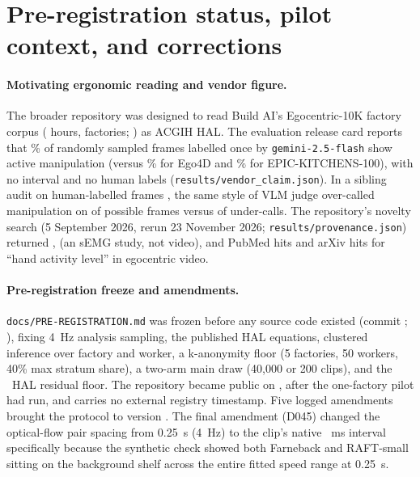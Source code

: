 \documentclass[11pt]{article}
\begin{document}

{\footnotesize\setlength{\bibsep}{0pt}}

\appendix

\section{Pre-registration status, pilot context, and corrections}
\label{app:protocol}

\paragraph{Motivating ergonomic reading and vendor figure.}
The broader repository was designed to read Build AI's Egocentric-10K factory corpus
(\cgCorpusHours{} hours, \cgCorpusFactories{} factories; \citep{buildai2025corpus}) as ACGIH HAL.
The evaluation release card \citep{buildai2025eval} reports that \cgVendorPct{}\% of
\cgVendorFrames{} randomly sampled frames labelled once by \texttt{gemini-2.5-flash} show active
manipulation (versus \cgVendorPctEgo{}\% for Ego4D and \cgVendorPctEpic{}\% for
EPIC-KITCHENS-100), with no interval and no human labels (\texttt{results/vendor\_claim.json}).
In a sibling audit on \cgSibLabels{} human-labelled frames \citep{theodoro2026vernier}, the same
style of VLM judge over-called manipulation on \cgSibOver{} of \cgSibOverOf{} possible frames
versus \cgSibUnder{} of \cgSibUnderOf{} under-calls. The repository's novelty search (5 September
2026, rerun 23 November 2026; \texttt{results/provenance.json}) returned \cgPubmedA{}, \cgPubmedB{}
(an sEMG study, not video), and \cgPubmedC{} PubMed hits and \cgArxivA{} arXiv hits for ``hand
activity level'' in egocentric video.

\paragraph{Pre-registration freeze and amendments.}
\texttt{docs/PRE-REGISTRATION.md} was frozen before any source code existed (commit
\cgFreezeShort{}; \citep{nosek2018}), fixing 4~Hz analysis sampling, the published HAL equations,
clustered inference over factory and worker, a k-anonymity floor (5 factories, 50 workers, 40\%
max stratum share), a two-arm main draw (40{,}000 or 200 clips), and the \cgHalBound{}~HAL residual
floor. The repository became public on \cgRepoCreated{}, after the one-factory pilot had run, and
carries no external registry timestamp. Five logged amendments brought the protocol to version
\cgPreregVersion{}. The final amendment (D045) changed the optical-flow pair spacing from 0.25~s
(4~Hz) to the clip's native \cgPairInterval{}~ms interval specifically because the synthetic check
showed both Farneback and RAFT-small sitting on the background shelf across the entire fitted speed
range at 0.25~s.
\end{document}

